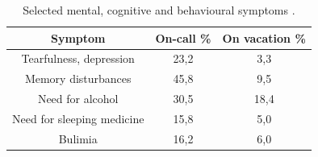 \documentclass{CML_Seminar_Template}
\begin{document}
\begin{table}
\begin{center}
\begin{tabular}{ |c|c|c|} 
 \hline
 Symptom & On-call \% & On vacation \% \\
 \hline
 Tearfulness, depression & 23,2 & 3,3 \\
 \hline
 Memory disturbances & 45,8 & 9,5 \\
 \hline
 Need for alcohol & 30,5 & 18,4 \\
 \hline
 Need for sleeping medicine & 15,8 & 5,0 \\
 \hline
 Bulimia & 16,2 & 6,0 \\
 \hline
\end{tabular}
\end{center}
    \caption{\label{CML_Seminar_Template_tab1} Selected mental, cognitive and behavioural symptoms \cite[]{Lindfors2006}. }
\end{table}
\end{document}
